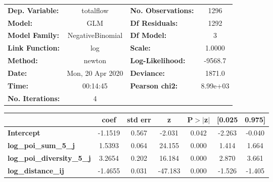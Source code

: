 \begin{center}
\begin{tabular}{lclc}
\toprule
\textbf{Dep. Variable:}            &    totalflow     & \textbf{  No. Observations:  } &     1296    \\
\textbf{Model:}                    &       GLM        & \textbf{  Df Residuals:      } &     1292    \\
\textbf{Model Family:}             & NegativeBinomial & \textbf{  Df Model:          } &        3    \\
\textbf{Link Function:}            &       log        & \textbf{  Scale:             } &    1.0000   \\
\textbf{Method:}                   &      newton      & \textbf{  Log-Likelihood:    } &   -9568.7   \\
\textbf{Date:}                     & Mon, 20 Apr 2020 & \textbf{  Deviance:          } &    1871.0   \\
\textbf{Time:}                     &     00:14:45     & \textbf{  Pearson chi2:      } &  8.99e+03   \\
\textbf{No. Iterations:}           &        4         & \textbf{                     } &             \\
\bottomrule
\end{tabular}
\begin{tabular}{lcccccc}
                                   & \textbf{coef} & \textbf{std err} & \textbf{z} & \textbf{P$> |$z$|$} & \textbf{[0.025} & \textbf{0.975]}  \\
\midrule
\textbf{Intercept}                 &      -1.1519  &        0.567     &    -2.031  &         0.042        &       -2.263    &       -0.040     \\
\textbf{log\_poi\_sum\_5\_j}       &       1.5393  &        0.064     &    24.155  &         0.000        &        1.414    &        1.664     \\
\textbf{log\_poi\_diversity\_5\_j} &       3.2654  &        0.202     &    16.184  &         0.000        &        2.870    &        3.661     \\
\textbf{log\_distance\_ij}         &      -1.4655  &        0.031     &   -47.183  &         0.000        &       -1.526    &       -1.405     \\
\bottomrule
\end{tabular}
\end{center}